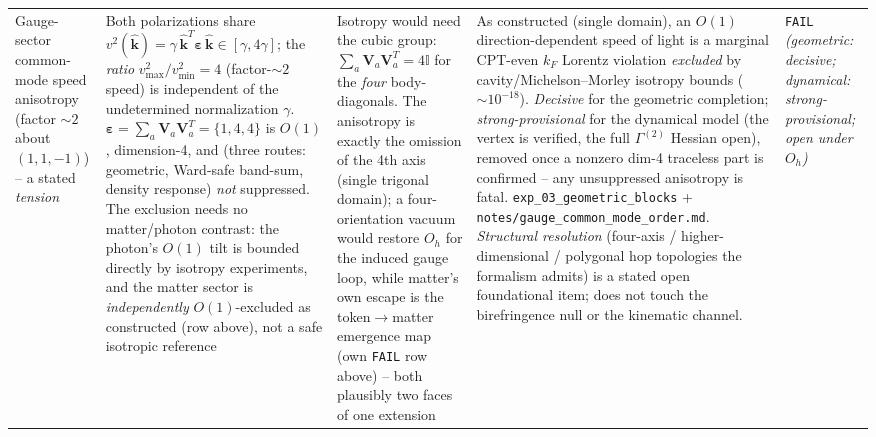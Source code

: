 {\begin{longtable}{@{}p{2.6cm}p{3.8cm}p{3.2cm}p{4.4cm}p{1.0cm}@{}}
Gauge-sector common-mode speed anisotropy (factor $\sim2$ about $(1,1,-1)$) -- a stated \emph{tension}
    & Both polarizations share $v^2(\hat{\mathbf{k}}) = \gamma\,\hat{\mathbf{k}}^T\boldsymbol\varepsilon\,\hat{\mathbf{k}} \in [\gamma,4\gamma]$; the \emph{ratio} $v^2_{\max}/v^2_{\min}=4$ (factor-$\sim2$ speed) is independent of the undetermined normalization $\gamma$. $\boldsymbol\varepsilon = \sum_a\mathbf{V}_a\mathbf{V}_a^T = \{1,4,4\}$ is $O(1)$, dimension-4, and (three routes: geometric, Ward-safe band-sum, density response) \emph{not} suppressed. The exclusion needs no matter/photon contrast: the photon's $O(1)$ tilt is bounded directly by isotropy experiments, and the matter sector is \emph{independently} $O(1)$-excluded as constructed (row above), not a safe isotropic reference
    & Isotropy would need the cubic group: $\sum_a\mathbf{V}_a\mathbf{V}_a^T = 4\mathbb{I}$ for the \emph{four} body-diagonals. The anisotropy is exactly the omission of the 4th axis (single trigonal domain); a four-orientation vacuum would restore $O_h$ for the induced gauge loop, while matter's own escape is the token$\to$matter emergence map (own \texttt{FAIL} row above) -- both plausibly two faces of one extension
    & As constructed (single domain), an $O(1)$ direction-dependent speed of light is a marginal CPT-even $k_F$ Lorentz violation \emph{excluded} by cavity/Michelson--Morley isotropy bounds ($\sim10^{-18}$). \emph{Decisive} for the geometric completion; \emph{strong-provisional} for the dynamical model (the vertex is verified, the full $\Gamma^{(2)}$ Hessian open), removed once a nonzero dim-4 traceless part is confirmed -- any unsuppressed anisotropy is fatal. \texttt{exp\_03\_geometric\_blocks} + \texttt{notes/gauge\_common\_mode\_order.md}. \emph{Structural resolution} (four-axis / higher-dimensional / polygonal hop topologies the formalism admits) is a stated open foundational item; does not touch the birefringence null or the kinematic channel.
    & \texttt{FAIL} \emph{(geometric: decisive; dynamical: strong-provisional; open under $O_h$)} \\


\end{longtable}}
